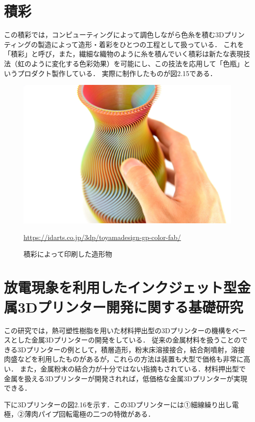 \section{積彩\cite{aas}}
\label{sec:enum}
この積彩では，コンピューティングによって調色しながら色糸を積む3Dプリンティングの製造によって造形・着彩をひとつの工程として扱っている．
これを「積彩」と呼び，また，繊細な織物のように糸を積んでいく積彩は新たな表現技法（虹のように変化する色彩効果）を可能にし、この技法を応用して「色瓶」というプロダクト製作している．
実際に制作したものが図2.15である．

\begin{figure}[H]
  \centering
  \includegraphics[width=12truecm]{./fig/sekisai.jpg}
  \caption{積彩によって印刷した造形物}
  \url{https://idarts.co.jp/3dp/toyamadesign-gp-color-fab/} %
  \label{fig:ferret}
\end{figure}

\section{放電現象を利用したインクジェット型金属3Dプリンター開発に関する基礎研究\cite{j}}
\label{sec:enum}
この研究では，熱可塑性樹脂を用いた材料押出型の3Dプリンターの機構をベースとした金属3Dプリンターの開発をしている．
従来の金属材料を扱うことのできる3Dプリンターの例として，積層造形，粉末床溶接接合，結合剤噴射，溶接肉盛などを利用したものがあるが，これらの方法は装置も大型で価格も非常に高い．
また，金属粉末の結合力が十分ではない指摘もされている．材料押出型で金属を扱える3Dプリンターが開発されれば，低価格な金属3Dプリンターが実現できる．

下に3Dプリンターの図2.16を示す．この3Dプリンターには①細線繰り出し電極，②薄肉パイプ回転電極の二つの特徴がある．

